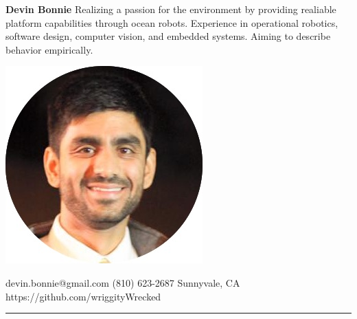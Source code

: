 \documentclass{article}
\begin{document}
{

%
\begin{minipage}[t]{0.33\textwidth}
\begin{flushleft}
 \textbf{\large{Devin Bonnie}}
 \vspace{4px}
\linebreak
\small{Realizing a passion for the environment by providing realiable platform capabilities through ocean robots. Experience in operational robotics, software design, computer vision, and embedded systems. Aiming to describe behavior empirically.\\}
\vspace*{1\baselineskip}
\end{flushleft}
\end{minipage}	
\begin{minipage}[c]{0.33\textwidth}
\begin{center}
\includegraphics[trim= 0cm 10cm 0 0cm,scale=0.22]{dbCircle}
\end{center}
\end{minipage}
\begin{minipage}[t]{0.33\textwidth}
\begin{flushright}
\vspace*{1\baselineskip}
devin.bonnie@gmail.com
 \vspace{2px}
\linebreak
(810) 623-2687
 \vspace{2px}
\linebreak
Sunnyvale, CA 
 \vspace{2px}
\linebreak
https://github.com/wriggityWrecked
\linebreak
\end{flushright}
\end{minipage}
%
\linebreak
\rule{560px}{0.25pt}

}
\end{document}
